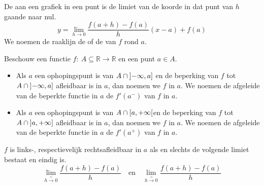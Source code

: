 \documentclass[main.tex]{subfiles}
\begin{document}
\begin{de}
  De  aan een grafiek in een punt is de limiet van de koorde in dat punt van $h$ gaande naar nul.
  \[ y = \lim_{h\rightarrow 0}\frac{f(a+h) -f(a)}{h} (x-a) + f(a) \]
  We noemen de raaklijn de  of de  van $f$ rond $a$.
\end{de}

\begin{de}
  Beschouw een functie $f:\ A \subseteq \mathbb{R} \rightarrow \mathbb{R}$ en een punt $a \in A$.
  \begin{itemize}
  \item Als $a$ een ophopingspunt is van $A \cap \interval[open left]{-\infty}{a}$ en de beperking van $f$ tot $A \cap \interval[open left]{-\infty}{a}$ afleidbaar is in $a$, dan noemen we $f$  in $a$.
    We noemen de afgeleide van de beperkte functie in $a$ de  $f'(a^{-})$ van $f$ in $a$.
  \item Als $a$ een ophopingspunt is van $A \cap \interval[open right]{a}{+\infty}$en de beperking van $f$ tot $A \cap \interval[open left]{a}{+\infty}$ afleidbaar is in $a$, dan noemen we $f$  in $a$.
    We noemen de afgeleide van de beperkte functie in $a$ de  $f'(a^{+})$ van $f$ in $a$.
  \end{itemize}
\end{de}

\begin{st}
  $f$ is links-, respectievelijk rechtsafleidbaar in $a$ als en slechts de volgende limiet bestaat en eindig is.
  \[ \lim_{h\overset{<}{\rightarrow} 0}\frac{f(a+h)-f(a)}{h} \quad\text{en}\quad \lim_{h\overset{>}{\rightarrow} 0}\frac{f(a+h)-f(a)}{h} \]
\end{st}
\end{document}
